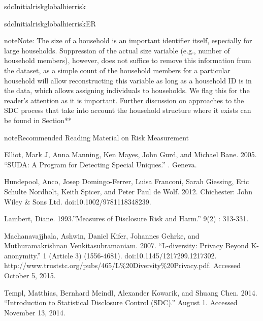 \documentclass[letterpaper,10pt,english]{sphinxmanual}
\begin{document}
\def\sphinxLiteralBlockLabel{\label{\detokenize{measure_risk:code414}}}
%
\begin{sphinxVerbatim}[commandchars=\\\{\},numbers=left,firstnumber=1,stepnumber=1]
 sdcInitialriskglobalhier\PYGZus{}risk

 sdcInitialriskglobalhier\PYGZus{}risk\PYGZus{}ER
\end{sphinxVerbatim}

\begin{sphinxadmonition}{note}{Note:}
The size of a household is an important identifier itself,
especially for large households. Suppression of the actual size variable
(e.g., number of household members), however, does not suffice to remove
this information from the dataset, as a simple count of the household
members for a particular household will allow reconstructing this
variable as long as a household ID is in the data, which allows
assigning individuals to households. We flag this for the reader’s
attention as it is important. Further discussion on approaches to the
SDC process that take into account the household structure where it
exists can be found in Section** 
\end{sphinxadmonition}

\begin{sphinxadmonition}{note}{Recommended Reading Material on Risk Measurement}

Elliot, Mark J, Anna Manning, Ken Mayes, John Gurd, and Michael Bane.
2005. “SUDA: A Program for Detecting Special Uniques.” .
Geneva.

Hundepool, Anco, Josep Domingo-Ferrer, Luisa Franconi, Sarah Giessing,
Eric Schulte Nordholt, Keith Spicer, and Peter Paul de Wolf. 2012.
 Chichester: John Wiley \& Sons Ltd.
doi:10.1002/9781118348239.

Lambert, Diane. 1993.”Measures of Disclosure Risk and Harm.”  9(2) : 313-331.

Machanavajjhala, Ashwin, Daniel Kifer, Johannes Gehrke, and
Muthuramakrishnan Venkitasubramaniam. 2007. “L-diversity: Privacy Beyond
K-anonymity.”  1 (Article 3)
(1556-4681). doi:10.1145/1217299.1217302.
http://www.truststc.org/pubs/465/L\%20Diversity\%20Privacy.pdf. Accessed
October 5, 2015.

Templ, Matthias, Bernhard Meindl, Alexander Kowarik, and Shuang Chen.
2014. “Introduction to Statistical Disclosure Control (SDC).”
August 1. Accessed November 13, 2014.
\end{sphinxadmonition}
\end{document}
